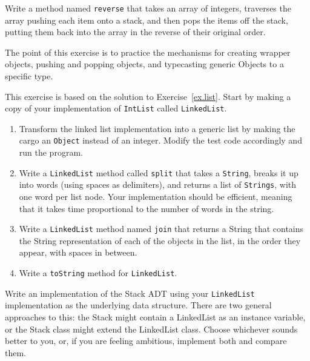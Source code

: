 \begin{exercise}
Write a method named {\tt reverse} that takes an array of integers,
traverses the array pushing each item onto a stack, and then pops
the items off the stack, putting them back into the array in the
reverse of their original order.

The point of this exercise is to practice the mechanisms for creating
wrapper objects, pushing and popping objects, and typecasting generic
Objects to a specific type.
\end{exercise}


\begin{exercise}
This exercise is based on the solution to Exercise~\ref{ex.list}.
Start by making a copy of your implementation of {\tt IntList}
called {\tt LinkedList}.

\begin {enumerate}

\item Transform the linked list implementation into a generic list by
making the cargo an {\tt Object} instead of an integer.
Modify the test code accordingly and run the program.

\item Write a {\tt LinkedList} method called {\tt split} that takes a
{\tt String}, breaks it up into words (using spaces as delimiters), and
returns a list of {\tt Strings}, with one word per list node.
Your implementation should be efficient, meaning that it takes
time proportional to the number of words in the string.

\item Write a {\tt LinkedList} method named {\tt join} that
returns a String that contains
the String representation of each of the objects in the list, in the order
they appear, with spaces in between.

\item Write a {\tt toString} method for {\tt LinkedList}. 

\end{enumerate}
\end{exercise}


\begin{exercise}
Write an implementation of the Stack ADT using your {\tt LinkedList}
implementation as the underlying data structure.  There are two
general approaches to this: the Stack might contain a LinkedList
as an instance variable, or the Stack class might extend the
LinkedList class.  Choose whichever sounds better to you, or,
if you are feeling ambitious, implement both and compare them.
\end{exercise}


